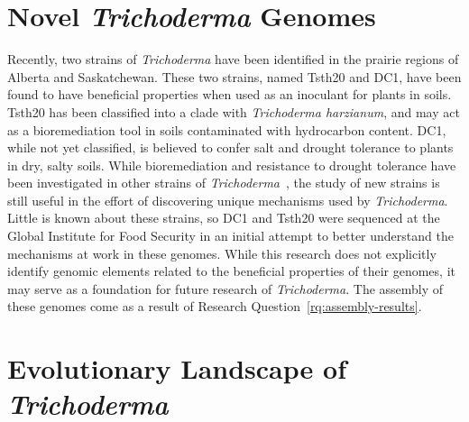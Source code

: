 \section{Novel \textit{Trichoderma} Genomes}\label{lit:novel-genomes}

Recently, two strains of \textit{Trichoderma} have been identified in
the prairie regions of Alberta and Saskatchewan. These two strains,
named Tsth20 and DC1, have been found to have beneficial properties
when used as an inoculant for plants in soils. Tsth20 has been
classified into a clade with \textit{Trichoderma harzianum}, and may
act as a bioremediation tool in soils contaminated with hydrocarbon
content. DC1, while not yet classified, is believed to confer salt and
drought tolerance to plants in dry, salty soils. While bioremediation
and resistance to drought tolerance have been investigated in other
strains of \textit{Trichoderma}~\cite{senizza2023}, the study of new
strains is still useful in the effort of discovering unique mechanisms
used by \textit{Trichoderma}. Little is known about these strains, so
DC1 and Tsth20 were sequenced at the Global Institute for Food
Security in an initial attempt to better understand the mechanisms at
work in these genomes. While this research does not explicitly
identify genomic elements related to the beneficial properties of
their genomes, it may serve as a foundation for future research
of \textit{Trichoderma}. The assembly of these genomes come as a
result of Research Question~\ref{rq:assembly-results}.

\section{Evolutionary Landscape of \textit{Trichoderma}}\label{lit:evolution}

